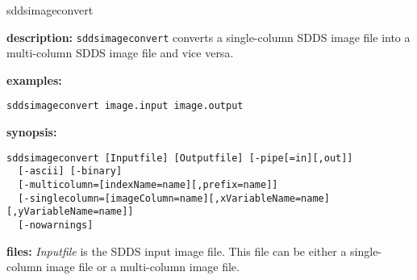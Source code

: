 %
\begin{sddsprog}{sddsimageconvert}
  \item \textbf{description:} \verb|sddsimageconvert| converts a single-column SDDS image file into a multi-column SDDS image file and vice versa.
  \item \textbf{examples:}
  \begin{verbatim}
sddsimageconvert image.input image.output
  \end{verbatim}
  \item \textbf{synopsis:}
  \begin{verbatim}
sddsimageconvert [Inputfile] [Outputfile] [-pipe[=in][,out]]
  [-ascii] [-binary]
  [-multicolumn=[indexName=name][,prefix=name]]
  [-singlecolumn=[imageColumn=name][,xVariableName=name][,yVariableName=name]]
  [-nowarnings]
  \end{verbatim}
  \item \textbf{files:}
  \emph{Inputfile} is the SDDS input image file. This file can be either a single-column image file or a multi-column image file.


\end{sddsprog}
